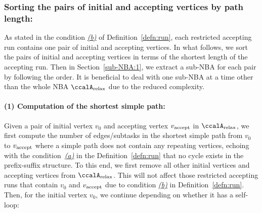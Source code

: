 \documentclass[Afour,sageh,times]{sagej}
\newcounter{mycounter}
\newcommand{\auto}[1]{\ccalA_{\textup{#1}}}
\newcommand{\vertex}[1]{v_{\textup{#1}}}
\begin{document}
{%

  \subsubsection{Sorting the pairs of initial and accepting vertices by path length:}\label{sec:sort}  As stated in the condition \hyperref[cond:b]{\it (b)} of Definition~\ref{defn:run}, each restricted accepting run  contains  one pair of initial and accepting vertices. In what follows, we sort the pairs of initial and accepting vertices in terms of the shortest length of the accepting run.  Then in Section~\ref{sub-NBA:1}, we extract a sub-NBA for each pair by following the order. It is beneficial to deal with one sub-NBA at a time other than the whole NBA $\auto{relax}$ due to the reduced complexity.
  \paragraph{(1) Computation of the shortest simple path:} Given a pair of initial vertex $v_0$ and accepting vertex $\vertex{accept}$ in $\auto{relax}$, we first compute the number of edges/subtasks in the shortest simple path from  $v_0$ to $\vertex{accept}$ where a simple path does not contain any  repeating vertices, echoing with the condition~\hyperref[cond:a]{\it (a)} in the Definition~\ref{defn:run} that no cycle exists in the prefix-suffix structure.
  To this end, we first remove all other initial vertices and accepting vertices from $\auto{relax}$. This will not affect those restricted  accepting runs that contain $v_0$ and $\vertex{accept}$ due to condition \hyperref[cond:b]{\it (b)}  in Definition~\ref{defn:run}.  Then, for the initial vertex $v_0$, we continue depending on whether it has a self-loop:
}
\end{document}
